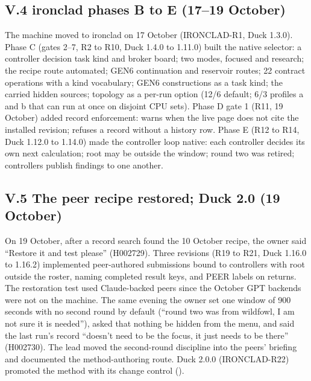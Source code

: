 \subsection{V.4 ironclad phases B to E (17--19 October)}\label{v.4-ironclad-phases-b-to-e-1719-october}

The machine moved to ironclad on 17 October (IRONCLAD-R1, Duck 1.3.0). Phase C (gates 2--7, R2 to R10, Duck 1.4.0 to 1.11.0) built the native
selector: a controller decision task kind and broker board; two modes, focused and research; the recipe route automated; GEN6 continuation and
reservoir routes; 22 contract operations with a kind vocabulary; GEN6 constructions as a task kind; the carried hidden sources; topology as a
per-run option (12/6 default; 6/3 profiles a and b that can run at once on disjoint CPU sets). Phase D gate 1 (R11, 19 October) added record
enforcement:  warns when the live page does not cite the installed revision;  refuses a record without a history
row. Phase E (R12 to R14, Duck 1.12.0 to 1.14.0) made the controller loop native: each controller decides its own next calculation; root may be
outside the window; round two was retired; controllers publish findings to one another.

\subsection{V.5 The peer recipe restored; Duck 2.0 (19 October)}\label{v.5-the-peer-recipe-restored-duck-2.0-19-october}

On 19 October, after a record search found the 10 October recipe, the owner said ``Restore it and test please'' (H002729). Three revisions
(R19 to R21, Duck 1.16.0 to 1.16.2) implemented peer-authored submissions bound to controllers with root outside the roster,  naming
completed result keys, and PEER labels on returns. The restoration test used Claude-backed peers since the October GPT backends were not on
the machine. The same evening the owner set one window of 900 seconds with no second round by default (``round two was from wildfowl, I am
not sure it is needed''), asked that nothing be hidden from the menu, and said the last run's record ``doesn't need to be the focus, it just
needs to be there'' (H002730). The lead moved the second-round discipline into the peers' briefing and documented the method-authoring route.
Duck 2.0.0 (IRONCLAD-R22) promoted the method with its change control ().

